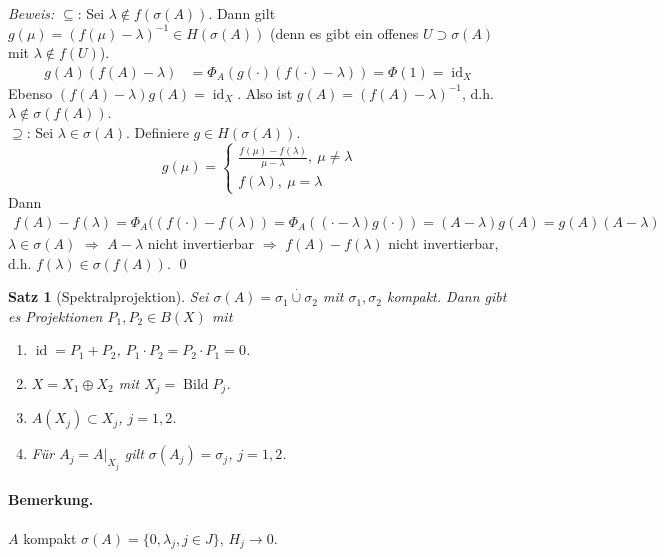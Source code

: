\documentclass[12pt]{extreport} %
\newtheorem{Satz}{Satz}[subsection]
\DeclareMathOperator{\Bild}{Bild}
\DeclareMathOperator{\id}{id}
\numberwithin{equation}{section}
\newcommand{\m}{\cdot}
\newcommand{\Bew}{\emph{Beweis: }}
\begin{document}
	\Bew \glqq $\subseteq$\grqq: Sei $\lambda \notin f(\sigma(A))$. Dann gilt $g(\mu) = (f(\mu)-\lambda)^{-1}\in H(\sigma(A))$ (denn es gibt ein offenes $U\supset \sigma(A)$ mit $\lambda \notin f(U)$).
	\begin{align*}
		g(A)(f(A)-\lambda) &= \Phi_A(g(\m) (f(\m)-\lambda)) = \Phi(1) = \id_X
	\end{align*}
	Ebenso $(f(A)-\lambda) g(A) = \id_X$. Also ist $g(A) = (f(A)-\lambda)^{-1}$, d.h. $\lambda \notin \sigma(f(A))$.\\
	\glqq $\supseteq$\grqq: Sei $\lambda \in \sigma(A)$. Definiere $g\in H(\sigma(A))$.
	$$g(\mu) = \left\{\begin{array}{l}
	\frac{f(\mu)-f(\lambda)}{\mu-\lambda},~ \mu\neq\lambda\\
	f(\lambda),~ \mu = \lambda
	\end{array} \right.$$
	Dann
	\begin{align*}
		f(A) - f(\lambda) =\Phi_A((f(\m)-f(\lambda)) = \Phi_A((\m-\lambda)g(\m)) = (A-\lambda)g(A) = g(A)(A-\lambda)
	\end{align*}
	$\lambda\in \sigma(A)$ $\Rightarrow$ $A-\lambda$ nicht invertierbar $\Rightarrow$ $f(A)-f(\lambda)$ nicht invertierbar, d.h. $f(\lambda)\in \sigma(f(A))$.
	\qed
	
	\begin{Satz}[Spektralprojektion]
		Sei $\sigma(A)= \sigma_1\overset{\m}{\cup} \sigma_2$ mit $\sigma_1,\sigma_2$ kompakt. Dann gibt es Projektionen $P_1,P_2\in  B(X)$ mit 
		\begin{enumerate}
			\item $\id= P_1+P_2$, $P_1\m P_2 = P_2\m P_1 = 0$.
			\item $X = X_1\oplus X_2$ mit $X_j = \Bild P_j$.
			\item $A(X_j) \subset X_j$, $j = 1,2$.
			\item Für $A_j = A|_{X_j}$ gilt $\sigma(A_j) = \sigma_j$, $j =1,2$.
		\end{enumerate}
	\end{Satz}
	
	\paragraph{Bemerkung.} $A$ kompakt $\sigma(A) = \{0, \lambda_j, j\in J\}$, $H_j\rightarrow 0$. 
	
\end{document}
